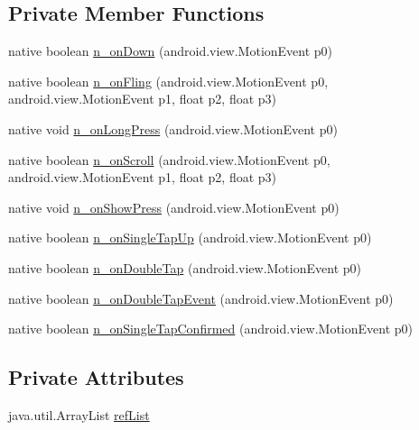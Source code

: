 \subsection*{Private Member Functions}
\begin{CompactItemize}
\item 
native boolean \hyperlink{classmd5b60ffeb829f638581ab2bb9b1a7f4f3f_1_1_inner_gesture_listener_be3cedcefc8a8fcf269a15e464191581}{n\_\-onDown} (android.view.MotionEvent p0)
\item 
native boolean \hyperlink{classmd5b60ffeb829f638581ab2bb9b1a7f4f3f_1_1_inner_gesture_listener_3eaaf5568a4411901b84c6d08f2573e4}{n\_\-onFling} (android.view.MotionEvent p0, android.view.MotionEvent p1, float p2, float p3)
\item 
native void \hyperlink{classmd5b60ffeb829f638581ab2bb9b1a7f4f3f_1_1_inner_gesture_listener_138e509e3561574241324ed8b861ce6f}{n\_\-onLongPress} (android.view.MotionEvent p0)
\item 
native boolean \hyperlink{classmd5b60ffeb829f638581ab2bb9b1a7f4f3f_1_1_inner_gesture_listener_dd13fc7286a83c759b9c172f24202ee3}{n\_\-onScroll} (android.view.MotionEvent p0, android.view.MotionEvent p1, float p2, float p3)
\item 
native void \hyperlink{classmd5b60ffeb829f638581ab2bb9b1a7f4f3f_1_1_inner_gesture_listener_67d6c8bf2cf830eab38fd1049f89602b}{n\_\-onShowPress} (android.view.MotionEvent p0)
\item 
native boolean \hyperlink{classmd5b60ffeb829f638581ab2bb9b1a7f4f3f_1_1_inner_gesture_listener_2b513c20d2b84f252840e2d071ba9c7d}{n\_\-onSingleTapUp} (android.view.MotionEvent p0)
\item 
native boolean \hyperlink{classmd5b60ffeb829f638581ab2bb9b1a7f4f3f_1_1_inner_gesture_listener_6096d4eb77ce5461f9c43af18ba2c449}{n\_\-onDoubleTap} (android.view.MotionEvent p0)
\item 
native boolean \hyperlink{classmd5b60ffeb829f638581ab2bb9b1a7f4f3f_1_1_inner_gesture_listener_a21c0778bbf55b409cb91a62fa883b9e}{n\_\-onDoubleTapEvent} (android.view.MotionEvent p0)
\item 
native boolean \hyperlink{classmd5b60ffeb829f638581ab2bb9b1a7f4f3f_1_1_inner_gesture_listener_91f9c46ec0b4d61ff8b2407b107aed2b}{n\_\-onSingleTapConfirmed} (android.view.MotionEvent p0)
\end{CompactItemize}
\subsection*{Private Attributes}
\begin{CompactItemize}
\item 
java.util.ArrayList \hyperlink{classmd5b60ffeb829f638581ab2bb9b1a7f4f3f_1_1_inner_gesture_listener_cfa733c8a1acdacd60c262d75991bf59}{refList}
\end{CompactItemize}


